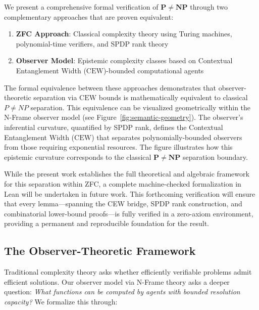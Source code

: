 \documentclass[12pt]{article}
\theoremstyle{definition}
\theoremstyle{definition}
\theoremstyle{remark}
\theoremstyle{remark}
\begin{document}
We present a comprehensive formal verification of $\mathbf{P} \neq \mathbf{NP}$ through two complementary approaches that are proven equivalent:

\begin{enumerate}
\item \textbf{ZFC Approach}: Classical complexity theory using Turing machines, polynomial-time verifiers, and SPDP rank theory
\item \textbf{Observer Model}: Epistemic complexity classes based on Contextual Entanglement Width ($\mathrm{CEW}$)-bounded computational agents
\end{enumerate}

The formal equivalence between these approaches demonstrates that observer-theoretic separation via $\mathrm{CEW}$ bounds is mathematically equivalent to classical $P \neq NP$ separation. This equivalence can be visualized geometrically within the N-Frame observer model (see Figure~\ref{fig:semantic-geometry}). The observer's inferential curvature, quantified by SPDP rank, defines the Contextual Entanglement Width ($\mathrm{CEW}$) that separates polynomially-bounded observers from those requiring exponential resources. The figure illustrates how this epistemic curvature corresponds to the classical $\mathbf{P} \neq \mathbf{NP}$ separation boundary.

While the present work establishes the full theoretical and algebraic framework for this separation within ZFC, a complete machine-checked formalization in Lean will be undertaken in future work. This forthcoming verification will ensure that every lemma---spanning the CEW bridge, SPDP rank construction, and combinatorial lower-bound proofs---is fully verified in a zero-axiom environment, providing a permanent and reproducible foundation for the result.

\subsection{The Observer-Theoretic Framework}

Traditional complexity theory asks whether efficiently verifiable problems admit efficient solutions. Our observer model via N-Frame theory asks a deeper question: \emph{What functions can be computed by agents with bounded resolution capacity?} We formalize this through:
\end{document}
